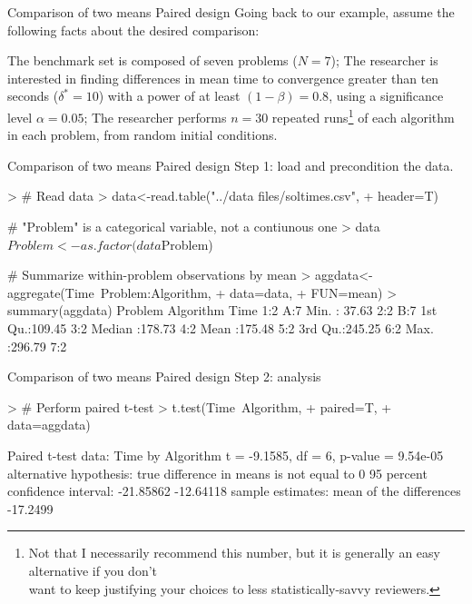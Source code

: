 \documentclass[t]{beamer}
\begin{document}

\begin{ftst}
{Comparison of two means}
{Paired design}
Going back to our example, assume the following facts about the desired comparison:

\bitems The benchmark set is composed of seven problems ($N=7$);
\spitem The researcher is interested in finding differences in mean time to convergence greater than ten seconds ($\delta^*=10$) with a power of at least $(1-\beta)=0.8$, using a significance level $\alpha=0.05$;
\spitem The researcher performs $n=30$ repeated runs\footnote[2]{\tiny Not that I necessarily recommend this number, but it is generally an easy alternative if you don't\\want to keep justifying your choices to less statistically-savvy reviewers.} of each algorithm in each problem, from random initial conditions.
\eitem

\end{ftst}

\begin{ftstf}
{Comparison of two means}
{Paired design}
Step 1: load and precondition the data.
\begin{rcode}
> # Read data
> data<-read.table("../data files/soltimes.csv",
+                  header=T)

# "Problem" is a categorical variable, not a contiunous one
> data$Problem<-as.factor(data$Problem)

# Summarize within-problem observations by mean
> aggdata<-aggregate(Time~Problem:Algorithm,
+                    data=data,
+                    FUN=mean)
> summary(aggdata)
 Problem Algorithm      Time       
 1:2     A:7       Min.   : 37.63  
 2:2     B:7       1st Qu.:109.45  
 3:2               Median :178.73  
 4:2               Mean   :175.48  
 5:2               3rd Qu.:245.25  
 6:2               Max.   :296.79  
 7:2                               

\end{rcode}
\end{ftstf}


\begin{ftstf}
{Comparison of two means}
{Paired design}
Step 2: analysis
\begin{rcode}
> # Perform paired t-test
> t.test(Time~Algorithm,
+        paired=T,
+        data=aggdata)

Paired t-test
data:  Time by Algorithm
t = -9.1585, df = 6, p-value = 9.54e-05
alternative hypothesis: true difference in means is not equal to 0
95 percent confidence interval:
 -21.85862 -12.64118
sample estimates:
mean of the differences 
               -17.2499 
\end{rcode}
\end{ftstf}
\end{document}
